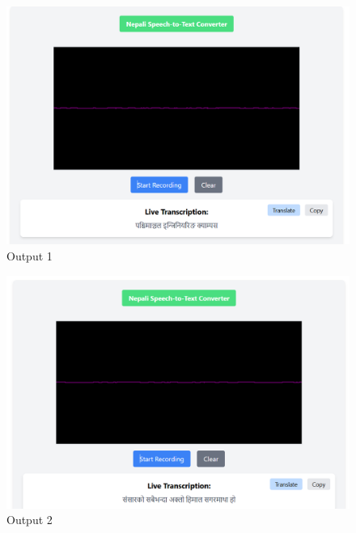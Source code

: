 
\begin{figure}[H]  %
    \centering
    \includegraphics[width=\textwidth]{Images/op1-after.png}
    \caption{Output 1}
    \label{fig:ref_vs_hyp}
\end{figure}


\begin{figure}[H]  %
    \centering
    \includegraphics[width=\textwidth]{Images/op2-after.png}
    \caption{Output 2}
    \label{fig:ref_vs_hyp}
\end{figure}


